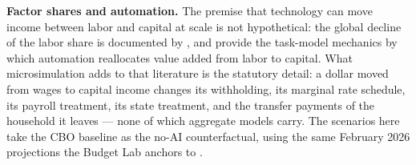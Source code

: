 \textbf{Factor shares and automation.} The premise that technology can move
income between labor and capital at scale is not hypothetical: the global
decline of the labor share is documented by \citet{karabarbounisneiman2014},
and \citet{acemoglurestrepo2018} provide the task-model mechanics by which
automation reallocates value added from labor to capital. What
microsimulation adds to that literature is the statutory detail: a dollar
moved from wages to capital income changes its withholding, its marginal
rate schedule, its payroll treatment, its state treatment, and the transfer
payments of the household it leaves --- none of which aggregate models
carry. The scenarios here take the CBO baseline as the no-AI counterfactual,
using the same February 2026 projections the Budget Lab anchors to
\citep{cbo2026}.
